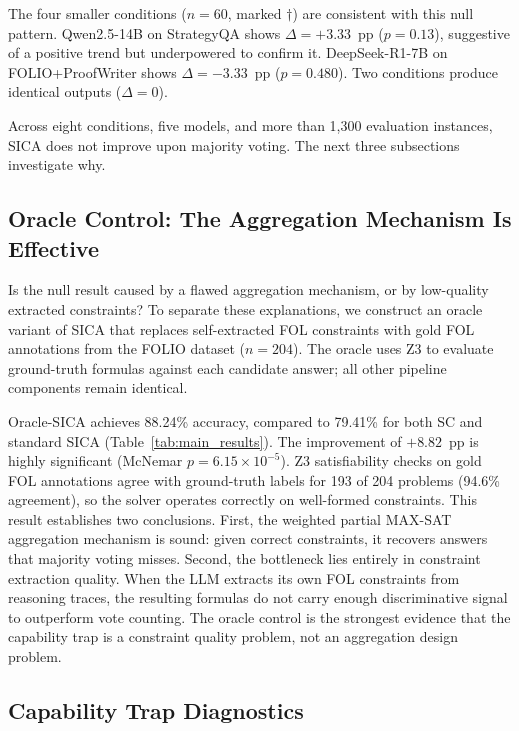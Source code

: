 The four smaller conditions ($n=60$, marked $\dagger$) are consistent with this null pattern. Qwen2.5-14B on StrategyQA shows $\Delta = +3.33$~pp ($p = 0.13$), suggestive of a positive trend but underpowered to confirm it. DeepSeek-R1-7B on FOLIO+ProofWriter shows $\Delta = -3.33$~pp ($p = 0.480$). Two conditions produce identical outputs ($\Delta = 0$).

Across eight conditions, five models, and more than 1,300 evaluation instances, SICA does not improve upon majority voting. The next three subsections investigate why.


\subsection{Oracle Control: The Aggregation Mechanism Is Effective}
\label{sec:oracle}

Is the null result caused by a flawed aggregation mechanism, or by low-quality extracted constraints? To separate these explanations, we construct an oracle variant of SICA that replaces self-extracted FOL constraints with gold FOL annotations from the FOLIO dataset ($n = 204$). The oracle uses Z3 to evaluate ground-truth formulas against each candidate answer; all other pipeline components remain identical.

Oracle-SICA achieves 88.24\% accuracy, compared to 79.41\% for both SC and standard SICA (Table~\ref{tab:main_results}). The improvement of $+8.82$~pp is highly significant (McNemar $p = 6.15 \times 10^{-5}$). Z3 satisfiability checks on gold FOL annotations agree with ground-truth labels for 193 of 204 problems (94.6\% agreement), so the solver operates correctly on well-formed constraints. This result establishes two conclusions. First, the weighted partial MAX-SAT aggregation mechanism is sound: given correct constraints, it recovers answers that majority voting misses. Second, the bottleneck lies entirely in constraint extraction quality. When the LLM extracts its own FOL constraints from reasoning traces, the resulting formulas do not carry enough discriminative signal to outperform vote counting. The oracle control is the strongest evidence that the capability trap is a constraint quality problem, not an aggregation design problem.


\subsection{Capability Trap Diagnostics}
\label{sec:diagnostics}

